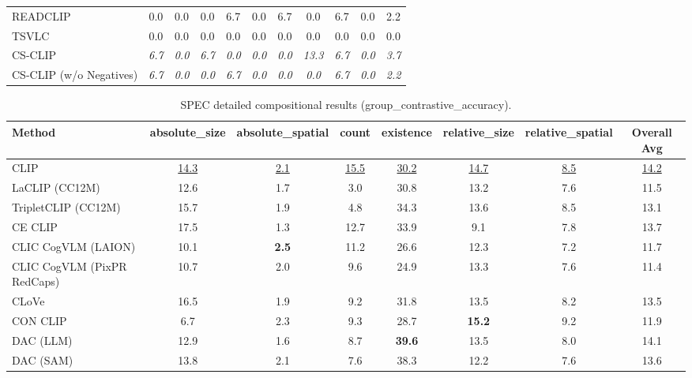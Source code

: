 \begin{table}[t]
\begin{adjustbox}{max width=\textwidth}
\begin{tabular}{p{5cm}c|c|c|c|c|c|c|c|c|c}
    READCLIP & 0.0 & 0.0 & 0.0 & 6.7 & 0.0 & 6.7 & 0.0 & 6.7 & 0.0 & 2.2 \\
    TSVLC & 0.0 & 0.0 & 0.0 & 0.0 & 0.0 & 0.0 & 0.0 & 0.0 & 0.0 & 0.0 \\
    \midrule
    CS-CLIP & \emph{6.7} & \emph{0.0} & \emph{6.7} & \emph{0.0} & \emph{0.0} & \emph{0.0} & \emph{13.3} & \emph{6.7} & \emph{0.0} & \emph{3.7} \\
    CS-CLIP (w/o Negatives) & \emph{6.7} & \emph{0.0} & \emph{0.0} & \emph{6.7} & \emph{0.0} & \emph{0.0} & \emph{0.0} & \emph{6.7} & \emph{0.0} & \emph{2.2} \\
    \bottomrule
  \end{tabular}
  \end{adjustbox}
\end{table}

\begin{table}[t]
  \centering
  \scriptsize
  \caption{SPEC detailed compositional results (group_contrastive_accuracy).}
  \label{tab:SPEC_detailed}
  \begin{adjustbox}{max width=\textwidth}
  \setlength{\tabcolsep}{2pt}
  \begin{tabular}{p{5cm}c|c|c|c|c|c|c}
    \toprule
    Method & absolute\_size & absolute\_spatial & count & existence & relative\_size & relative\_spatial & Overall Avg \\
    \midrule
    CLIP & \underline{14.3} & \underline{2.1} & \underline{15.5} & \underline{30.2} & \underline{14.7} & \underline{8.5} & \underline{14.2} \\
    \midrule
    LaCLIP (CC12M) & 12.6 & 1.7 & 3.0 & 30.8 & 13.2 & 7.6 & 11.5 \\
    TripletCLIP (CC12M) & 15.7 & 1.9 & 4.8 & 34.3 & 13.6 & 8.5 & 13.1 \\
    \midrule
    CE CLIP & 17.5 & 1.3 & 12.7 & 33.9 & 9.1 & 7.8 & 13.7 \\
    CLIC CogVLM (LAION) & 10.1 & \textbf{2.5} & 11.2 & 26.6 & 12.3 & 7.2 & 11.7 \\
    CLIC CogVLM (PixPR RedCaps) & 10.7 & 2.0 & 9.6 & 24.9 & 13.3 & 7.6 & 11.4 \\
    CLoVe & 16.5 & 1.9 & 9.2 & 31.8 & 13.5 & 8.2 & 13.5 \\
    CON CLIP & 6.7 & 2.3 & 9.3 & 28.7 & \textbf{15.2} & 9.2 & 11.9 \\
    DAC (LLM) & 12.9 & 1.6 & 8.7 & \textbf{39.6} & 13.5 & 8.0 & 14.1 \\
    DAC (SAM) & 13.8 & 2.1 & 7.6 & 38.3 & 12.2 & 7.6 & 13.6 \\

\end{tabular}
\end{adjustbox}
\end{table}
